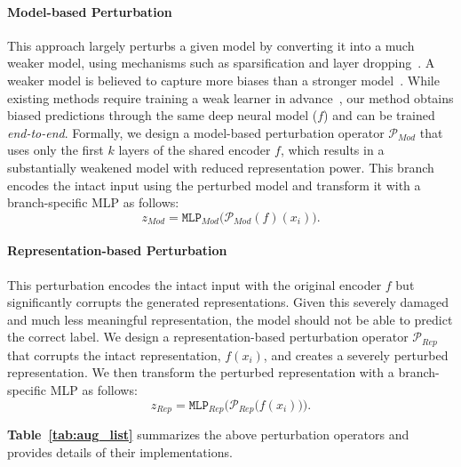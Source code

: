 \paragraph{Model-based Perturbation} This approach largely perturbs a given model by converting it into a much weaker model, using mechanisms such as sparsification and layer dropping~\citep{NEURIPS2021_6e8404c3}. A weaker model is believed to capture more biases than a stronger model~\citep{ghaddar-etal-2021-end,sanh2020learning,utama-etal-2020-towards}. While existing methods require training a weak learner in advance~\citep{utama-etal-2020-towards,sanh2020learning,meissner-etal-2022-debiasing}, our method obtains biased predictions through the same deep neural model ($f$) and can be trained \emph{end-to-end}. Formally, we design a model-based perturbation operator $\mathcal{P}_{Mod}$ that uses only the first $k$ layers of the shared encoder $f$, which results in a substantially weakened model with reduced representation power. This branch encodes the intact input using the perturbed model and transform it with a branch-specific MLP as follows:
\begin{equation}
    z_{Mod} = \texttt{MLP}_{Mod} \Big( \mathcal{P}_{Mod}(f)(x_i) \Big).
\end{equation}



\paragraph{Representation-based Perturbation} This perturbation encodes the intact input with the original encoder $f$ but significantly corrupts the generated representations. Given this severely damaged and much less meaningful representation, the model should not be able to predict the correct label. We design a representation-based perturbation operator $\mathcal{P}_{Rep}$ that corrupts the intact representation, $f(x_i)$, and creates a severely perturbed representation. We then transform the perturbed representation with a branch-specific MLP as follows:
\begin{equation}
\label{eq:rep_aug}
    z_{Rep} = \texttt{MLP}_{Rep} \Big( \mathcal{P}_{Rep} \big( f(x_i) \big) \Big).
\end{equation}





\textbf{Table~\ref{tab:aug_list}} summarizes the above perturbation operators and provides details of their implementations. 




